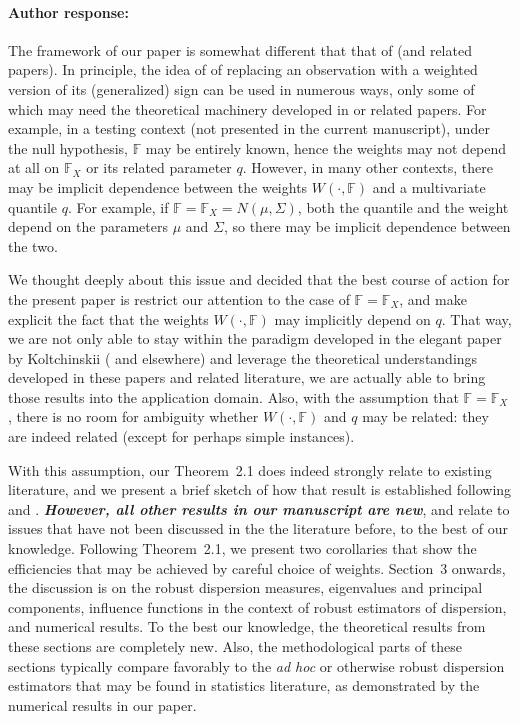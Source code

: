 \documentclass[11pt,letterpaper]{article}
\newcommand{\BF}{{\mathbb{F}}}
\theoremstyle{definition} \newtheorem{Definition}[Theorem]{Definition}
\begin{document}
\paragraph{Author response:}
The framework of our paper is somewhat different that that of \cite{ref:AoS97435_Koltchinskii} (and related papers). 
In principle, the idea of of replacing an observation with a weighted version of its (generalized) sign can be used in numerous ways, only some of which may need the theoretical machinery developed in \cite{ref:AoS97435_Koltchinskii} or related papers. 
For example, in a testing context (not presented in the current manuscript), 
under the null hypothesis, $\BF$ may be entirely known, hence the weights may not 
depend at all on $\BF_{X}$ or its related parameter $q$. 
 However, in many other contexts, there may be implicit dependence between the
weights $W (\cdot, \BF)$ and a multivariate quantile $q$. For example, if 
$\BF = \BF_{X} = N( \mu, \Sigma)$, both the quantile  and the weight depend on the 
parameters $\mu$ and $\Sigma$, so there may be implicit dependence between the two. 

We thought deeply about this issue and decided that the best course of action for the present paper is restrict our attention to the case of $\BF = \BF_{X}$, and 
make explicit the fact that the weights $W (\cdot, \BF)$ may implicitly depend on 
$q$. That way, we are not only able to stay within the paradigm developed in the elegant paper by Koltchinskii (\cite{ref:AoS97435_Koltchinskii} and elsewhere) and leverage the 
theoretical understandings developed in these papers and related literature, we are actually able to bring those results into the application domain. 
Also, with the assumption that $\BF = \BF_{X}$, there is no room for ambiguity whether
$W (\cdot, \BF)$ and $q$ may be related: they are indeed related (except for  
perhaps simple instances).
 
With this assumption, our Theorem~2.1 does indeed strongly relate to existing literature, 
and we present a brief sketch of how that result is established following 
\cite{ref:AoS921514_Niemiro} and \cite{ref:AoS891631_Haberman}. 
\textbf{\textit{However,
all other results in our manuscript are new}}, and relate to issues that have not been discussed in the the literature before, to the best of our knowledge. Following Theorem~2.1, we present two corollaries that show the efficiencies that may be achieved
by careful choice of weights. Section~3 onwards, the discussion is on the robust dispersion measures, eigenvalues and principal components, influence functions in the context of robust estimators of dispersion, and numerical results. To the best our 
knowledge, the theoretical results from these sections are completely new. Also, the methodological parts of these sections typically compare favorably to the \textit{ad hoc}
or otherwise robust dispersion estimators that may be found in statistics literature, as demonstrated by the numerical results in our paper.
\end{document}
